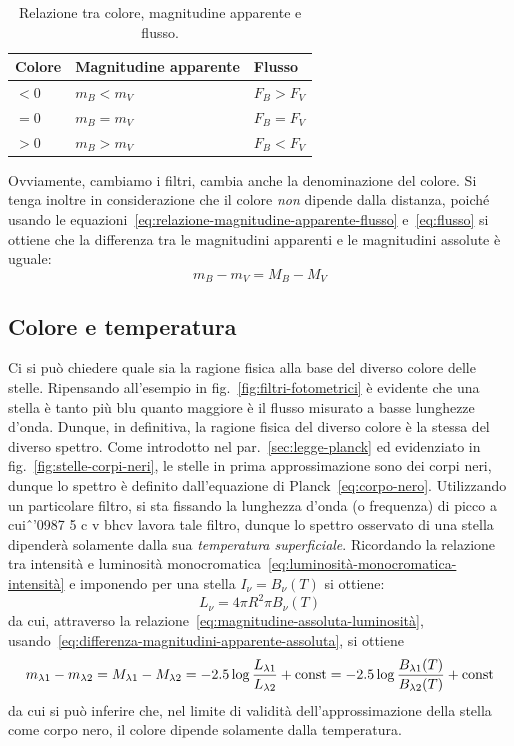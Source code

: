 \begin{table}
\caption{Relazione tra colore, magnitudine apparente e flusso.}
\label{tab:colore}
\centering
\begin{tabular}{lll}
\toprule
Colore & Magnitudine apparente & Flusso \\
\midrule
$<0$ & $m_B < m_V$ & $F_B > F_V$ \\
$=0$ & $m_B = m_V$ & $F_B = F_V$ \\
$>0$ & $m_B > m_V$ & $F_B < F_V$ \\
\bottomrule
\end{tabular}
\end{table}

Ovviamente, cambiamo i filtri, cambia anche la denominazione del colore. Si tenga inoltre in considerazione che il colore \emph{non} dipende dalla distanza, poiché usando le equazioni~\eqref{eq:relazione-magnitudine-apparente-flusso} e~\eqref{eq:flusso} si ottiene che la differenza tra le magnitudini apparenti e le magnitudini assolute è uguale:
\begin{equation}\label{eq:differenza-magnitudini-apparente-assoluta}
    m_B-m_V = M_B-M_V
\end{equation}

\subsection{Colore e temperatura}
Ci si può chiedere quale sia la ragione fisica alla base del diverso colore delle stelle. Ripensando all'esempio in fig.~\ref{fig:filtri-fotometrici} è evidente che una stella è tanto più blu quanto maggiore è il flusso misurato a basse lunghezze d'onda. Dunque, in definitiva, la ragione fisica del diverso colore è la stessa del diverso spettro. Come introdotto nel par.~\ref{sec:legge-planck} ed evidenziato in fig.~\ref{fig:stelle-corpi-neri}, le stelle in prima approssimazione sono dei corpi neri, dunque lo spettro è definito dall'equazione di Planck~\eqref{eq:corpo-nero}. Utilizzando un particolare filtro, si sta fissando la lunghezza d'onda (o frequenza) di picco a cuiˆ'0987 5        c v
     bhcv lavora tale filtro, dunque lo spettro osservato di una stella dipenderà solamente dalla sua \emph{temperatura superficiale}. Ricordando la relazione tra intensità e luminosità monocromatica~\eqref{eq:luminosità-monocromatica-intensità} e imponendo per una stella $I_\nu = B_\nu (T)$ si ottiene:
\[
    L_\nu = 4 \pi R^2 \pi B_\nu (T)
\]
da cui, attraverso la relazione~\eqref{eq:magnitudine-assoluta-luminosità}, usando~\eqref{eq:differenza-magnitudini-apparente-assoluta}, si ottiene
\[
    m_{\lambda 1} - m_{\lambda 2} = M_{\lambda 1} - M_{\lambda 2} = -2.5 \log\frac{L_{\lambda 1}}{L_{\lambda 2}} + \textup{const} = -2.5 \log\frac{B_{\lambda 1}(T)}{B_{\lambda 2}(T)} + \textup{const}
\]
da cui si può inferire che, nel limite di validità dell'approssimazione della stella come corpo nero, il colore dipende solamente dalla temperatura.

